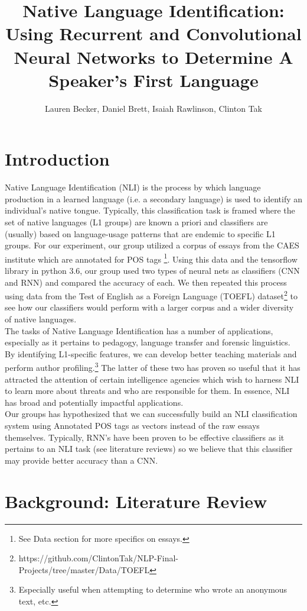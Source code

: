 \documentclass[11pt,a4paper]{article}
\title{Native Language Identification: Using Recurrent and Convolutional Neural Networks to Determine A Speaker's First Language}
\author{Lauren Becker, Daniel Brett, Isaiah Rawlinson, Clinton Tak}
\date{}
\newcommand\tab[1][1cm]{\hspace*{#1}}
\begin{document}
\maketitle




\section{Introduction}
 \tab Native Language Identification (NLI) is the process by which language production in a learned language (i.e. a secondary language) is used to identify an individual's native tongue. Typically, this classification task is framed where the set of native languages (L1 groups) are known a priori and classifiers are (usually) based on language-usage patterns that are endemic to specific L1 groups. For our experiment, our group utilized a corpus of essays from the CAES institute which are annotated for POS tags \footnote{See Data section for more specifics on essays.}. Using this data and the tensorflow library in python 3.6, our group used two types of neural nets as classifiers (CNN and RNN) and compared the accuracy of each. We then repeated this process using data from the Test of English as a Foreign Language (TOEFL) dataset\footnote{https://github.com/ClintonTak/NLP-Final-Projects/tree/master/Data/TOEFL} to see how our classifiers would perform with a larger corpus and a wider diversity of native languages.\\
 \tab The tasks of Native Language Identification has a number of applications, especially as it pertains to pedagogy, language transfer and forensic linguistics. By identifying L1-specific features, we can develop better teaching materials and perform author profiling.\footnote{Especially useful when attempting to determine who wrote an anonymous text, etc.} The latter of these two has proven so useful that it has attracted the attention of certain intelligence agencies which wish to harness NLI to learn more about threats and who are responsible for them. In essence, NLI has broad and potentially impactful applications.\\
 \tab Our groups has hypothesized that we can successfully build an NLI classification system using Annotated POS tags as vectors instead of the raw essays themselves. Typically, RNN's have been proven to be effective classifiers as it pertains to an NLI task (see literature reviews) so we believe that this classifier may provide better accuracy than a CNN.
 
 \section{Background: Literature Review}
\end{document}
